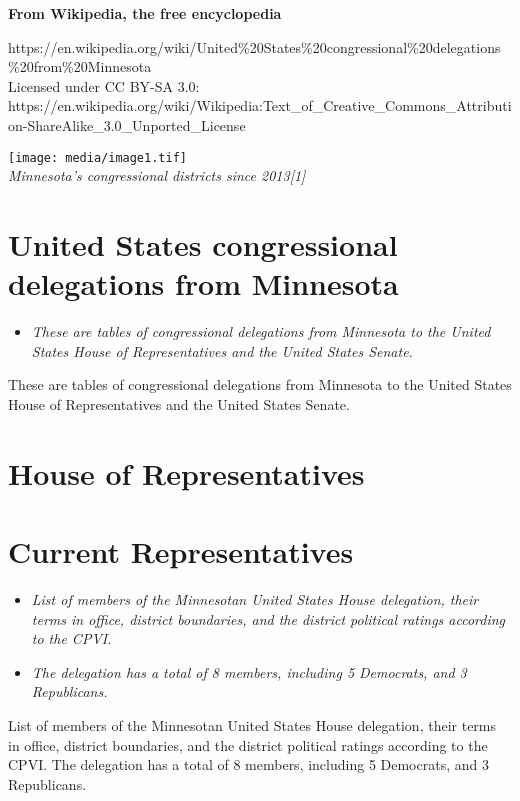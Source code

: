 \textbf{From Wikipedia, the free encyclopedia}

https://en.wikipedia.org/wiki/United\%20States\%20congressional\%20delegations\%20from\%20Minnesota\\
Licensed under CC BY-SA 3.0:\\
https://en.wikipedia.org/wiki/Wikipedia:Text\_of\_Creative\_Commons\_Attribution-ShareAlike\_3.0\_Unported\_License

\texttt{[image: media/image1.tif]}\\
\emph{Minnesota's congressional districts since 2013{[}1{]}}

\section{United States congressional delegations from
Minnesota}\label{united-states-congressional-delegations-from-minnesota}

\begin{itemize}
\item
  \emph{These are tables of congressional delegations from Minnesota to
  the United States House of Representatives and the United States
  Senate.}
\end{itemize}

These are tables of congressional delegations from Minnesota to the
United States House of Representatives and the United States Senate.

\section{House of Representatives}\label{house-of-representatives}

\section{Current Representatives}\label{current-representatives}

\begin{itemize}
\item
  \emph{List of members of the Minnesotan United States House
  delegation, their terms in office, district boundaries, and the
  district political ratings according to the CPVI.}
\item
  \emph{The delegation has a total of 8 members, including 5 Democrats,
  and 3 Republicans.}
\end{itemize}

List of members of the Minnesotan United States House delegation, their
terms in office, district boundaries, and the district political ratings
according to the CPVI. The delegation has a total of 8 members,
including 5 Democrats, and 3 Republicans.

